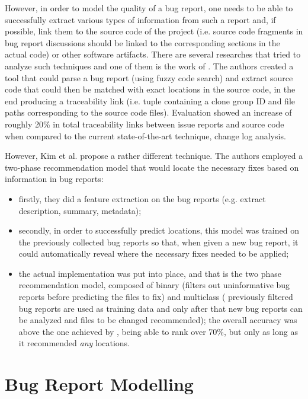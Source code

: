 \documentclass[11pt,english,twocolumn]{article}
\begin{document}
However, in order to model the quality of a bug report, one needs to be able to
successfully extract various types of information from such a report and, if 
possible, link them to the source code of the project (i.e. source code fragments
in bug report discussions should be linked to the corresponding sections in the 
actual code) or other software artifacts. There are several researches that tried 
to analyze such techniques and one of them is the work of 
\cite{bettenburg2012using}. The authors created a tool that could parse a bug 
report (using fuzzy code search) and extract source code that could then be
matched with exact locations in the source code, in the end producing a 
traceability link (i.e. tuple containing a clone group ID and file paths 
corresponding to the source code files). Evaluation showed an increase of
roughly 20\% in total traceability links between issue reports and source code 
when compared to the current state-of-the-art technique, change log analysis.

However, Kim et al. \cite{kim2013should} propose a rather different technique.
The authors employed a two-phase recommendation model that would locate the 
necessary fixes based on information in bug reports:
  \begin{itemize}
    \item firstly, they did a feature extraction on the bug reports (e.g. 
    extract description, summary, metadata);
    \item secondly, in order to successfully predict
    locations, this model was trained on the previously collected bug reports so that,
    when given a new bug report, it could automatically reveal where the necessary fixes
    needed to be applied;
    \item the actual implementation was put into place, and that
    is the two phase recommendation model, composed of binary (filters out 
    uninformative bug reports before predicting the files to fix) and multiclass (
    previously filtered bug reports are used as training data and only after that
    new bug reports can be analyzed and files to be changed recommended); the 
    overall accuracy was above the one achieved by \cite{bettenburg2012using}, 
    being able to rank over 70\%, but only as long as it recommended \emph{any} 
    locations.
  \end{itemize}

\section{Bug Report Modelling}
\label{sec:bug-report}
\end{document}
